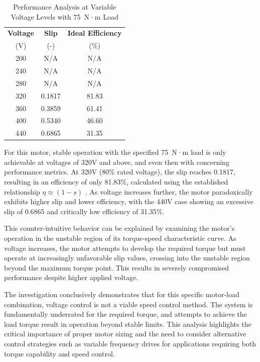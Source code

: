 \documentclass[a4paper,12pt]{IEEEtran}
\begin{document}
\begin{table}[htbp]
    \centering
    \caption{Performance Analysis at Variable Voltage Levels with 75~N·m Load}
    \begin{tabular}{|c|c|c|}
        \hline
        \textbf{Voltage} & \textbf{Slip} & \textbf{Ideal Efficiency} \\
        (V) & (-) & (\%) \\
        \hline
        200 & N/A & N/A \\
        240 & N/A & N/A \\
        280 & N/A & N/A \\
        320 & 0.1817 & 81.83 \\
        360 & 0.3859 & 61.41 \\
        400 & 0.5340 & 46.60 \\
        440 & 0.6865 & 31.35 \\
        \hline
    \end{tabular}
    \label{tab:voltage_control}
\end{table}

For this motor, stable operation with the specified 75~N·m load is only achievable at voltages of 320V and above, and even then with concerning performance metrics. At 320V (80\% rated voltage), the slip reaches 0.1817, resulting in an efficiency of only 81.83\%, calculated using the established relationship $\eta \approx (1-s)$ . As voltage increases further, the motor paradoxically exhibits higher slip and lower efficiency, with the 440V case showing an excessive slip of 0.6865 and critically low efficiency of 31.35\%.

This counter-intuitive behavior can be explained by examining the motor's operation in the unstable region of its torque-speed characteristic curve. As voltage increases, the motor attempts to develop the required torque but must operate at increasingly unfavorable slip values, crossing into the unstable region beyond the maximum torque point. This results in severely compromised performance despite higher applied voltage.

The investigation conclusively demonstrates that for this specific motor-load combination, voltage control is not a viable speed control method. The system is fundamentally underrated for the required torque, and attempts to achieve the load torque result in operation beyond stable limits. This analysis highlights the critical importance of proper motor sizing and the need to consider alternative control strategies such as variable frequency drives for applications requiring both torque capability and speed control.
\end{document}
